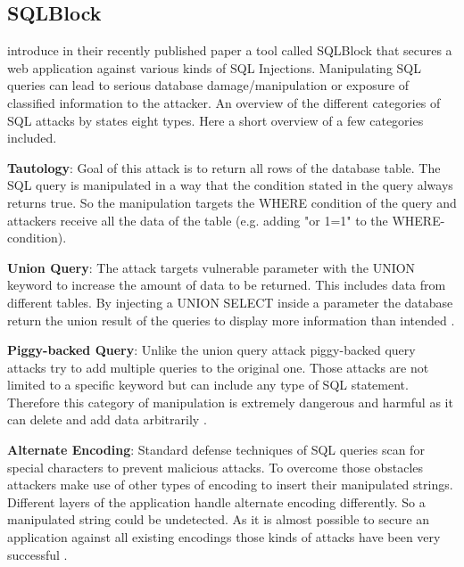 \subsection{SQLBlock}

\textcite[]{Jahanshahi2018} introduce in their recently published paper a tool called SQLBlock that secures a web application against various kinds of SQL Injections. Manipulating SQL queries can lead to serious database damage/manipulation or exposure of classified information to the attacker. An overview of the different categories of SQL attacks by \textcite[3ff.]{Halfond2008} states eight types. Here a short overview of a few categories included.\newline


\textbf{Tautology}: Goal of this attack is to return all rows of the database table. The SQL query is manipulated in a way that the condition stated in the query always returns true. So the manipulation targets the WHERE condition of the query and attackers receive all the data of the table (e.g. adding "or 1=1" to the WHERE-condition)\autocite[3]{Halfond2008}.\newline


\textbf{Union Query}: The attack targets vulnerable parameter with the UNION keyword to increase the amount of data to be returned. This includes data from different tables. By injecting a UNION SELECT inside a parameter the database return the union result of the queries to display more information than intended \autocite[4]{Halfond2008}.\newline


\textbf{Piggy-backed Query}: Unlike the union query attack piggy-backed query attacks try to add multiple queries to the original one. Those attacks are not limited to a specific keyword but can include any type of SQL statement. Therefore this category of manipulation is extremely dangerous and harmful as it can delete and add data arbitrarily \autocite[4]{Halfond2008}.\newline


\textbf{Alternate Encoding}: Standard defense techniques of SQL queries scan for special characters to prevent malicious attacks. To overcome those obstacles attackers make use of other types of encoding to insert their manipulated strings. Different layers of the application handle alternate encoding differently. So a manipulated string could be undetected. As it is almost possible to secure an application against all existing encodings those kinds of attacks have been very successful \autocite[5]{Halfond2008}.\newline

